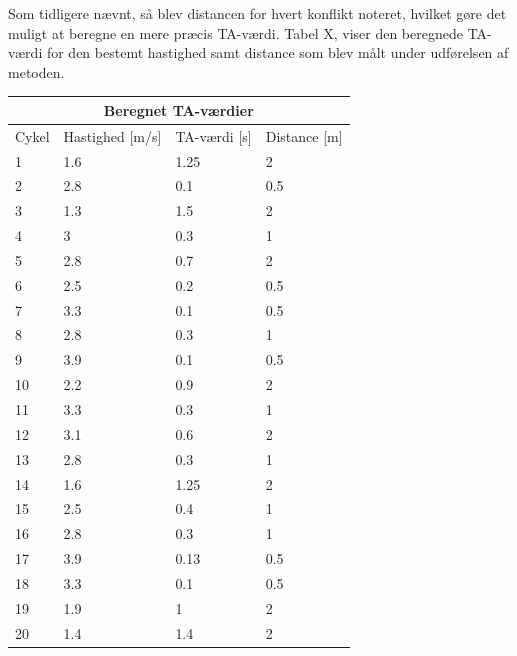 Som tidligere nævnt, så blev distancen for hvert konflikt noteret, hvilket gøre det muligt at beregne en mere præcis TA-værdi. Tabel X, viser den beregnede TA-værdi for den bestemt hastighed samt distance som blev målt under udførelsen af metoden.
\begin{tabular}{ |p{1cm}|p{4cm}|p{4cm}|p{4cm}|  }
\hline
\multicolumn{4}{|c|}{Beregnet TA-værdier} \\
\hline
Cykel & Hastighed [m/s] & TA-værdi [s] & Distance [m] \\
\hline
1 & 1.6   & 1.25 & 2 \\
2 & 2.8 & 0.1 & 0.5 \\
3 & 1.3 & 1.5 & 2 \\
4 & 3  & 0.3 & 1 \\
5 & 2.8  & 0.7 & 2 \\
6 & 2.5   & 0.2 & 0.5 \\
7 & 3.3  & 0.1 & 0.5 \\
8 & 2.8  & 0.3 & 1 \\
9 & 3.9  & 0.1 & 0.5 \\
10 & 2.2  & 0.9   & 2 \\
11 & 3.3 & 0.3 &  1 \\
12 & 3.1 & 0.6 &   2\\
13 & 2.8 & 0.3 & 1\\
14 & 1.6  & 1.25   & 2\\
15 & 2.5  & 0.4 & 1\\
16 & 2.8 & 0.3 & 1\\
17 & 3.9 & 0.13 &0.5\\
18 & 3.3 & 0.1 & 0.5\\
19 & 1.9  & 1 & 2\\
20 & 1.4  & 1.4 & 2\\
\hline
\end{tabular}


